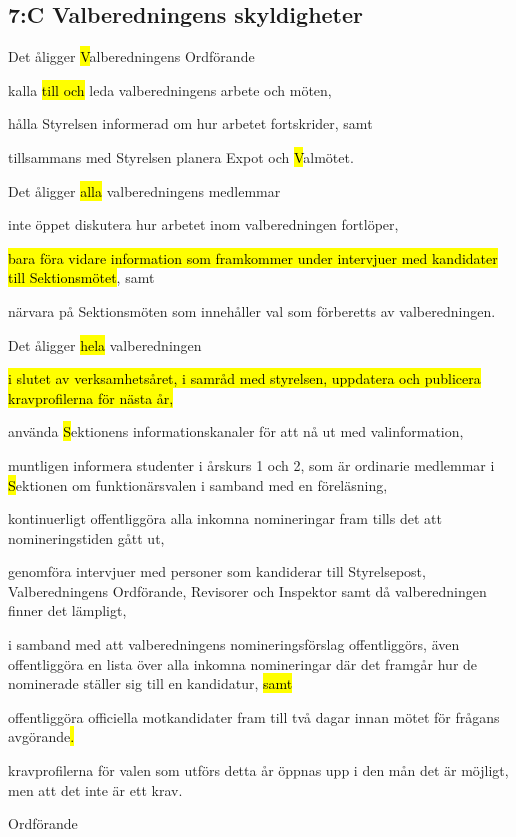 \documentclass[../_main/handlingar.tex]{subfiles}
\begin{document}
\begin{attsatser}
        \subsection*{7:C Valberedningens skyldigheter}
        Det åligger \hl{V}alberedningens Ordförande
        \begin{attlist}
            \item kalla \hl{till och} leda valberedningens arbete och möten,
            \item hålla Styrelsen informerad om hur arbetet fortskrider, samt
            \item tillsammans med Styrelsen planera Expot och \hl{V}almötet.
        \end{attlist}
        Det åligger \hl{alla} valberedningens medlemmar
        \begin{attlist}
            \item inte öppet diskutera hur arbetet inom valberedningen fortlöper,
            \item \hl{bara föra vidare information som framkommer under intervjuer med kandidater till Sektionsmötet}, samt
            \item närvara på Sektionsmöten som innehåller val som förberetts av valberedningen.
        \end{attlist}
        Det åligger \hl{hela} valberedningen
        \begin{attlist}
            \item \hl{i slutet av verksamhetsåret, i samråd med styrelsen, uppdatera och publicera kravprofilerna för nästa år,}
            \item använda \hl{S}ektionens informationskanaler för att nå ut med valinformation,
            \item muntligen informera studenter i årskurs 1 och 2, som är ordinarie medlemmar i \hl{S}ektionen om funktionärsvalen i samband med en föreläsning,
            \item kontinuerligt offentliggöra alla inkomna nomineringar fram tills det att nomineringstiden gått ut,
            \item genomföra intervjuer med personer som kandiderar till Styrelsepost, Valberedningens Ordförande, Revisorer och Inspektor samt då valberedningen finner det lämpligt,
            \item i samband med att valberedningens nomineringsförslag offentliggörs, även offentliggöra en lista över alla inkomna nomineringar där det framgår hur de nominerade ställer sig till en kandidatur, \hl{samt}
            \item offentliggöra officiella motkandidater fram till två dagar innan mötet för frågans avgörande\hl{.}
        \end{attlist}

    \changenote

    \newpage

    \att kravprofilerna för valen som utförs detta år öppnas upp i den mån det är möjligt, men att det inte är ett krav.
\end{attsatser}

\begin{signatures}{1}
    \ist
    \signature{\ordf}{Ordförande}
\end{signatures}
\end{document}
